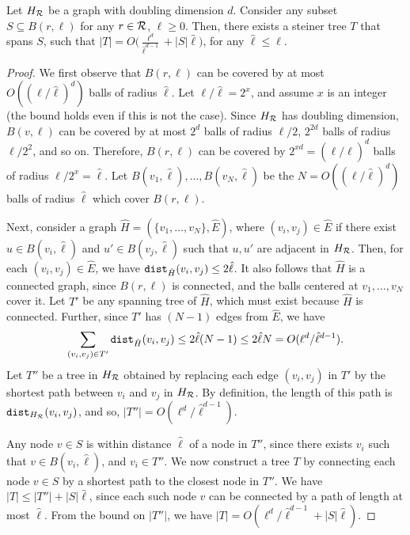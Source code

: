 \begin{lemma}
\label{lemma:udg}
Let $H_{\mathcal{R}}$ be a graph with doubling dimension $d$.
Consider any subset $S\subseteq B(r, \ell)$ for any $r\in\mathcal{R}$, $\ell\geq 0$.
Then, there exists a steiner tree $T$ that spans $S$, such that $|T|=O\Big(\frac{\ell^d}{\hat{\ell}^{d-1}}+|S|\hat{\ell}\Big)$, for any $\hat{\ell}\leq\ell$.
\end{lemma}
\begin{proof} 
We first observe that $B(r, \ell)$ can be covered by at most $O((\ell/\hat{\ell})^d)$ balls of radius $\hat{\ell}$. Let $\ell/\hat{\ell}=2^x$, and assume $x$ is an integer (the bound holds even if this is not the case). Since $H_{\mathcal{R}}$ has doubling dimension, $B(v, \ell)$ can be covered by at most $2^d$ balls of radius $\ell/2$, $2^{2d}$ balls of radius $\ell/2^2$, and so on. Therefore, $B(r, \ell)$ can be covered by $2^{xd}=(\ell/\hat{\ell})^d$ balls of radius $\ell/2^x=\hat{\ell}$. Let $B(v_1,\hat{\ell}),\ldots,B(v_N,\hat{\ell})$ be the $N=O((\ell/\hat{\ell})^d)$ balls of radius $\hat{\ell}$ which cover $B(r, \ell)$.

Next, consider a graph $\hat{H}=(\{v_1,\ldots,v_N\},\hat{E})$, where $(v_i, v_j)\in\hat{E}$ if there exist $u\in B(v_i, \hat{\ell})$ and $u'\in B(v_j, \hat{\ell})$ such that $u, u'$ are adjacent in $H_{\mathcal{R}}$. Then, for each $(v_i, v_j)\in \hat{E}$, we have $\texttt{dist}_{\hat{H}}(v_i, v_j)\leq 2\hat{\ell}$. 
It also follows that $\hat{H}$ is a connected graph, since $B(r, \ell)$ is connected, and the balls centered at $v_1,\ldots,v_N$ cover it. Let $T'$ be any spanning tree of $\hat{H}$, which must exist because $\hat{H}$ is connected. Further, since $T'$ has $(N-1)$ edges from $\hat{E}$, we have $$
\sum_{(v_i, v_j)\in T'}\texttt{dist}_{\hat{H}}(v_i, v_j)\leq 2\hat{\ell}(N-1)\leq 2\hat{\ell}N=O(\ell^d/\hat{\ell}^{d-1}).
$$
Let $T''$ be a tree in $H_{\mathcal{R}}$ obtained by replacing each edge $(v_i, v_j)$ in $T'$ by the shortest path between $v_i$ and $v_j$ in $H_{\mathcal{R}}$. By definition, the length of this path is $\texttt{dist}_{H_{\mathcal{R}}}(v_i, v_j)$, and so, $|T''|=O(\ell^d/\hat{\ell}^{d-1})$.

Any node $v\in S$ is within distance $\hat{\ell}$ of a node in $T''$, since there exists $v_i$ such that $v\in B(v_i, \hat{\ell})$, and $v_i\in T''$. We now construct a tree $T$ by connecting each node $v\in S$ by a shortest path to the closest node in $T''$. We have $|T|\leq |T''|+|S|\hat{\ell}$, since each such node $v$ can be connected by a path of length at most $\hat{\ell}$. From the bound on $|T''|$, we have $|T|=O(\ell^d/\hat{\ell}^{d-1}+|S|\hat{\ell})$.
\end{proof}


